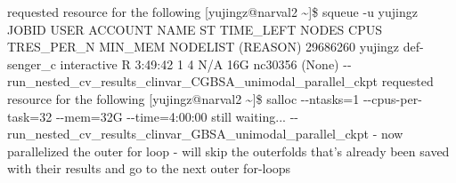\documentclass{article}%
\begin{document}
\newline%
\newline%
%
%
\newline%
\newline%
%
requested resource for the following %
\newline%
\newline%
%
{[}yujingz@narval2 \textasciitilde{}{]}\$ squeue {-}u yujingz%
\newline%
\newline%
%
          JOBID     USER      ACCOUNT           NAME  ST  TIME\_LEFT NODES CPUS TRES\_PER\_N MIN\_MEM NODELIST (REASON) %
\newline%
\newline%
%
       29686260  yujingz def{-}senger\_c    interactive   R    3:49:42     1    4        N/A     16G nc30356 (None) %
\newline%
\newline%
%
%
\newline%
\newline%
%
{-}{-}run\_nested\_cv\_results\_clinvar\_CGBSA\_unimodal\_parallel\_ckpt%
\newline%
\newline%
%
%
\newline%
\newline%
%
requested resource for the following %
\newline%
\newline%
%
{[}yujingz@narval2 \textasciitilde{}{]}\$ salloc {-}{-}ntasks=1 {-}{-}cpus{-}per{-}task=32 {-}{-}mem=32G {-}{-}time=4:00:00%
\newline%
\newline%
%
%
\newline%
\newline%
%
still waiting... %
\newline%
\newline%
%
%
\newline%
\newline%
%
{-}{-}run\_nested\_cv\_results\_clinvar\_GBSA\_unimodal\_parallel\_ckpt%
\newline%
\newline%
%
%
\newline%
\newline%
%
{-} now parallelized the outer for loop%
\newline%
\newline%
%
{-} will skip the outerfolds that's already been saved with their results and go to the next outer for{-}loops %
\newline%
\end{document}
